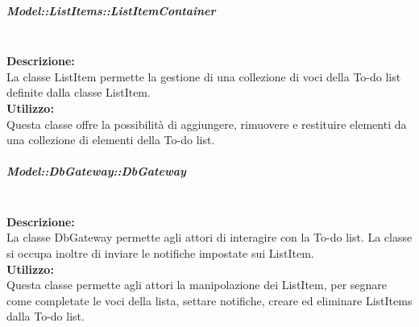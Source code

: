 \subparagraph{Model\-::List\-Items\-::List\-Item\-Container}\label{todo-container}\mbox{}\\
\textbf{Descrizione:}\\
La classe List\-Item permette la gestione di una collezione di voci della To-do list definite dalla classe List\-Item.\\
\textbf{Utilizzo:}\\
Questa classe offre la possibilità di aggiungere, rimuovere e restituire elementi da una collezione di elementi della To-do list.\\

\subparagraph{Model\-::Db\-Gateway\-::Db\-Gateway}\label{todo-gateway}\mbox{}\\
\textbf{Descrizione:}\\
La classe Db\-Gateway permette agli attori di interagire con la To-do list. La classe si occupa inoltre di inviare le notifiche impostate sui List\-Item. \\
\textbf{Utilizzo:}\\
Questa classe permette agli attori la manipolazione dei List\-Item, per segnare come completate le voci della lista, settare notifiche, creare ed eliminare List\-Items dalla To-do list.\\
